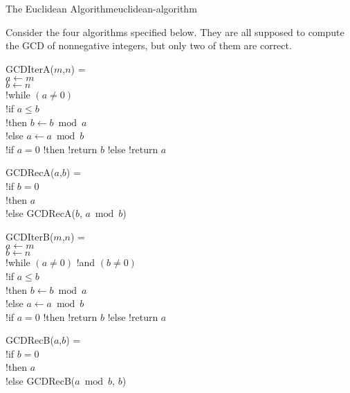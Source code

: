 \documentclass{tufte-handout}
\begin{document}
\begin{model*}{The Euclidean Algorithm}{euclidean-algorithm}

  Consider the four algorithms specified below. They are all supposed
  to compute the GCD of nonnegative integers, but only two of them are
  correct. \bigskip

\begin{minipage}[t]{.5\textwidth}
\begin{acode}
\> GCDIterA($m$,$n$) = \\
\> \tb \> $a \gets m$ \\
\>     \> $b \gets n$ \\
\>     \> !while $(a \neq 0)$ \\
\>     \> \tb \> !if $a \leq b$ \\
\>     \>     \> \tb \> !then \> $b \gets b \bmod a$ \\
\>     \>     \>     \> !else \> $a \gets a \bmod b$ \\
\>     \> !if $a = 0$ !then !return $b$ !else !return $a$
\end{acode} \bigskip

\begin{acode}
\> GCDRecA($a$,$b$) = \\
\> \tb \> !if $b = 0$ \\
\>     \> \tb \> !then \> $a$ \\
\>     \>     \> !else \> GCDRecA($b$, $a \bmod b$)
\end{acode}
\end{minipage}
\begin{minipage}[t]{.5\textwidth}
\begin{acode}
\> GCDIterB($m$,$n$) = \\
\> \tb \> $a \gets m$ \\
\>     \> $b \gets n$ \\
\>     \> !while $(a \neq 0)$ !and $(b \neq 0)$ \\
\>     \> \tb \> !if $a \leq b$ \\
\>     \>     \> \tb \> !then \> $b \gets b \bmod a$ \\
\>     \>     \>     \> !else \> $a \gets a \bmod b$ \\
\>     \> !if $a = 0$ !then !return $b$ !else !return $a$
\end{acode} \bigskip

\begin{acode}
\> GCDRecB($a$,$b$) = \\
\> \tb \> !if $b = 0$ \\
\>     \> \tb \> !then \> $a$ \\
\>     \>     \> !else \> GCDRecB($a \bmod b$, $b$)
\end{acode}
\end{minipage}
\end{model*}
\end{document}
